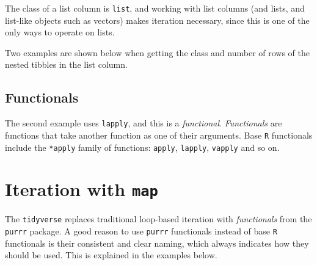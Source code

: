 \documentclass[]{book}
\newenvironment{Shaded}{}{}
\newcommand{\CommentTok}[1]{\textcolor[rgb]{0.38,0.63,0.69}{\textit{#1}}}
\newcommand{\ControlFlowTok}[1]{\textcolor[rgb]{0.00,0.44,0.13}{\textbf{#1}}}
\newcommand{\DataTypeTok}[1]{\textcolor[rgb]{0.56,0.13,0.00}{#1}}
\newcommand{\KeywordTok}[1]{\textcolor[rgb]{0.00,0.44,0.13}{\textbf{#1}}}
\newcommand{\NormalTok}[1]{#1}
\newcommand{\OperatorTok}[1]{\textcolor[rgb]{0.40,0.40,0.40}{#1}}
\begin{document}
The class of a list column is \texttt{list}, and working with list columns (and lists, and list-like objects such as vectors) makes iteration necessary, since this is one of the only ways to operate on lists.

Two examples are shown below when getting the class and number of rows of the nested tibbles in the list column.

\begin{Shaded}
\end{Shaded}

\hypertarget{functionals}{%
\subsection*{Functionals}\label{functionals}}

The second example uses \texttt{lapply}, and this is a \emph{functional}. \emph{Functionals} are functions that take another function as one of their arguments. Base \texttt{R} functionals include the \texttt{*apply} family of functions: \texttt{apply}, \texttt{lapply}, \texttt{vapply} and so on.

\hypertarget{iteration-with-map}{%
\section{\texorpdfstring{Iteration with \texttt{map}}{Iteration with map}}\label{iteration-with-map}}

The \texttt{tidyverse} replaces traditional loop-based iteration with \emph{functionals} from the \texttt{purrr} package. A good reason to use \texttt{purrr} functionals instead of base \texttt{R} functionals is their consistent and clear naming, which always indicates how they should be used.
This is explained in the examples below.
\end{document}
